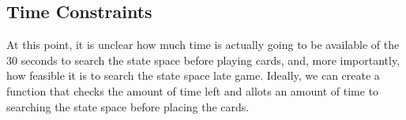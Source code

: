 \documentclass[twoside]{article}
\begin{document}
\begin{multicols}{2}
\subsection{Time Constraints}
At this point, it is unclear how much time is actually going to be available of the 30 seconds to search the state space before playing cards, and, more importantly, how feasible it is to search the state space late game. Ideally, we can create a function that checks the amount of time left and allots an amount of time to searching the state space before placing the cards.









\end{multicols}
\end{document}
